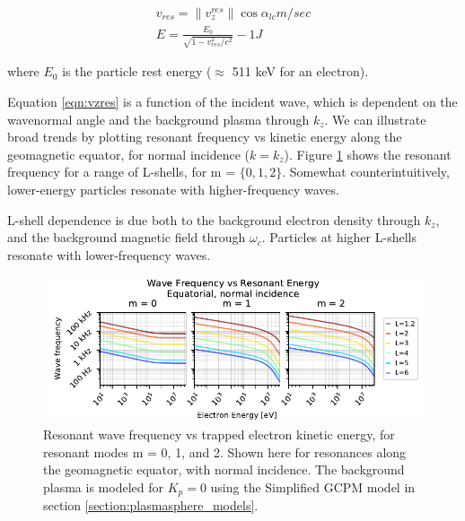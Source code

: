 \begin{eqnarray}
v_{res} = \|v_z^{res}\|\cos\alpha_{lc}  \unit{m/sec}\\ 
E = \frac{E_{0}}{\sqrt{1 - v_{res}^2/c^2}} - 1 \unit{J}
\end{eqnarray}

where $E_{0}$ is the particle rest energy ($\approx$ 511 keV for an electron).

Equation \eqref{eqn:vzres} is a function of the incident wave, which is dependent on the wavenormal angle and the background plasma through $k_z$. We can illustrate broad trends by plotting resonant frequency vs kinetic energy along the geomagnetic equator, for normal incidence ($k = k_z$). Figure \ref{fig:vzres_vs_modes} shows the resonant frequency for a range of L-shells, for m = $\{0,1,2\}$. Somewhat counterintuitively, lower-energy particles resonate with higher-frequency waves.

L-shell dependence is due both to the background electron density through $k_z$, and the background magnetic field through $\omega_c$. Particles at higher L-shells resonate with lower-frequency waves.

\begin{figure}[h]
\begin{center}
\includegraphics{figures/wave_frequency_vs_energy_vs_mode_3up.pdf}

\caption[Resonant frequency vs particle energy for resonant modes 0, 1, and 2]{Resonant wave frequency vs trapped electron kinetic energy, for resonant modes m = 0, 1, and 2. Shown here for resonances along the geomagnetic equator, with normal incidence. The background plasma is modeled for $K_p=0$ using the Simplified GCPM model in section \ref{section:plasmasphere_models}.}
\label{fig:vzres_vs_modes}
\end{center}
\end{figure}

